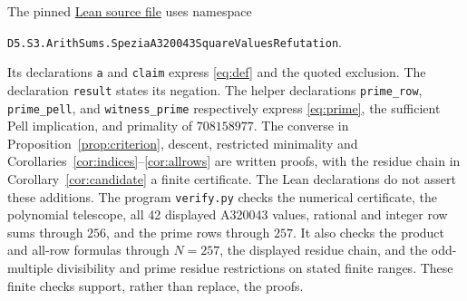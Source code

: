 \documentclass[11pt]{article}
\begin{document}
The pinned
\href{https://github.com/the-omega-institute/trureturing/blob/73ec20a01fc35e0f53bc258c605821728f3c33b6/D5/S3/ArithSums/SpeziaA320043SquareValuesRefutation.lean}{Lean source file}
uses namespace
\begin{center}\small
\texttt{D5.S3.ArithSums.SpeziaA320043SquareValuesRefutation}.
\end{center}
Its declarations \texttt{a} and \texttt{claim} express
\eqref{eq:def} and the quoted exclusion. The declaration
\texttt{result} states its negation. The helper declarations
\texttt{prime\_row}, \texttt{prime\_pell}, and
\texttt{witness\_prime} respectively express \eqref{eq:prime},
the sufficient Pell implication, and primality of $708158977$.
The converse in Proposition~\ref{prop:criterion}, descent, restricted
minimality and Corollaries~\ref{cor:indices}--\ref{cor:allrows} are written
proofs, with the residue chain in Corollary~\ref{cor:candidate} a finite
certificate. The Lean declarations do not assert these additions. The program
\texttt{verify.py} checks the numerical certificate, the polynomial
telescope, all 42 displayed A320043 values, rational and integer
row sums through $256$, and the prime rows through $257$. It also checks
the product and all-row formulas through $N=257$, the displayed residue chain,
and the odd-multiple divisibility and prime residue restrictions on stated
finite ranges. These finite checks support, rather than replace, the proofs.
\end{document}
